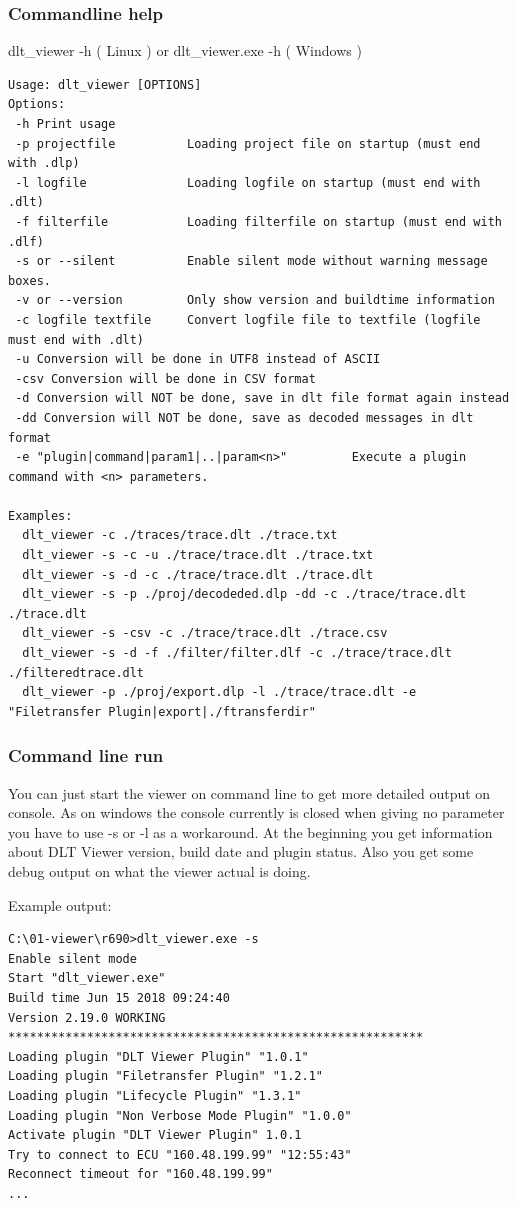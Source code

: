 \documentclass[a4paper,11pt]{article}
\begin{document}
\subsubsection{Commandline help}

dlt\_viewer -h ( Linux ) or dlt\_viewer.exe -h ( Windows )

\footnotesize\begin{verbatim}
Usage: dlt_viewer [OPTIONS]
Options:
 -h Print usage
 -p projectfile          Loading project file on startup (must end with .dlp)
 -l logfile              Loading logfile on startup (must end with .dlt)
 -f filterfile           Loading filterfile on startup (must end with .dlf)
 -s or --silent          Enable silent mode without warning message boxes.
 -v or --version         Only show version and buildtime information
 -c logfile textfile     Convert logfile file to textfile (logfile must end with .dlt)
 -u Conversion will be done in UTF8 instead of ASCII
 -csv Conversion will be done in CSV format
 -d Conversion will NOT be done, save in dlt file format again instead
 -dd Conversion will NOT be done, save as decoded messages in dlt format
 -e "plugin|command|param1|..|param<n>"         Execute a plugin command with <n> parameters.

Examples:
  dlt_viewer -c ./traces/trace.dlt ./trace.txt
  dlt_viewer -s -c -u ./trace/trace.dlt ./trace.txt
  dlt_viewer -s -d -c ./trace/trace.dlt ./trace.dlt
  dlt_viewer -s -p ./proj/decodeded.dlp -dd -c ./trace/trace.dlt ./trace.dlt
  dlt_viewer -s -csv -c ./trace/trace.dlt ./trace.csv
  dlt_viewer -s -d -f ./filter/filter.dlf -c ./trace/trace.dlt ./filteredtrace.dlt
  dlt_viewer -p ./proj/export.dlp -l ./trace/trace.dlt -e "Filetransfer Plugin|export|./ftransferdir"
\end{verbatim}
\normalsize

\subsubsection{Command line run}
You can just start the viewer on command line to get more detailed output on console.
As on windows the console currently is closed when giving no parameter you have to use -s or
-l as a workaround. At the beginning you get information about DLT Viewer version, build date and plugin status.
Also you get some debug output on what the viewer actual is doing.

Example output:

\begin{verbatim}
C:\01-viewer\r690>dlt_viewer.exe -s
Enable silent mode
Start "dlt_viewer.exe"
Build time Jun 15 2018 09:24:40
Version 2.19.0 WORKING
**********************************************************
Loading plugin "DLT Viewer Plugin" "1.0.1"
Loading plugin "Filetransfer Plugin" "1.2.1"
Loading plugin "Lifecycle Plugin" "1.3.1"
Loading plugin "Non Verbose Mode Plugin" "1.0.0"
Activate plugin "DLT Viewer Plugin" 1.0.1
Try to connect to ECU "160.48.199.99" "12:55:43"
Reconnect timeout for "160.48.199.99"
...
\end{verbatim}
\end{document}
